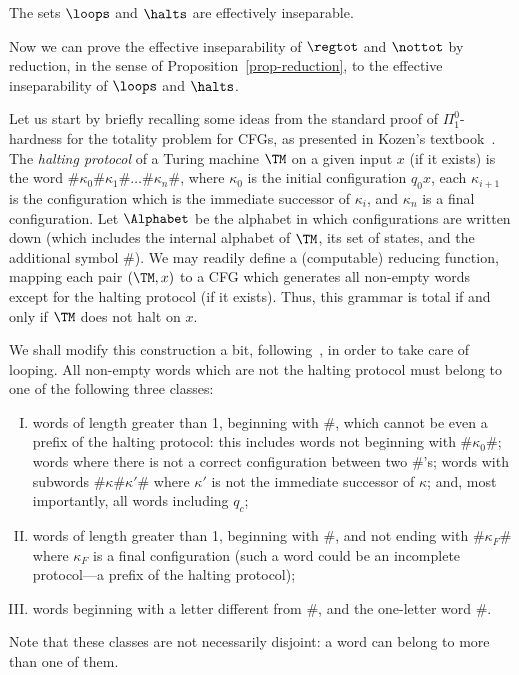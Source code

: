 \begin{proposition}\label{prop-insepCH}
The sets $\loops$ and $\halts$ are effectively inseparable.
\end{proposition}

Now we can prove the effective inseparability of $\regtot$ and $\nottot$ by reduction, in the sense of Proposition~\ref{prop-reduction}, to the effective inseparability of $\loops$ and $\halts$.


Let us start by briefly recalling some ideas from the standard proof of $\Pi^0_1$-hardness for the totality problem for CFGs, as presented in Kozen's textbook~\cite{Kozen1997}. 
The {\em halting protocol} of a Turing machine $\TM$ on a given input $x$ (if it exists) is the word $\# \kappa_0 \# \kappa_1 \# \ldots \# \kappa_n \#$, where $\kappa_0$ is the initial configuration $q_0 x$, each $\kappa_{i+1}$ is the configuration which is the immediate successor of $\kappa_i$, and $\kappa_n$ is a final configuration. Let $\Alphabet$ be the alphabet in which configurations are written down (which includes the internal alphabet of $\TM$, its set of states, and the additional symbol $\#$).
We may readily define a (computable) {reducing function}, mapping each pair $(\TM,x)$ to a CFG which generates all non-empty words except for the halting protocol (if it exists). Thus, this grammar is total if and only if $\TM$ does not halt on $x$. 



We shall modify this construction a bit, following~\cite{Kuznetsov2021TOCL}, in order to take care of looping. 
All non-empty words which are not the halting protocol must belong to one of the following three classes:%
\begin{enumerate}[(I)]
\item\label{not-prefix-haltprot} words of length greater than 1, beginning with $\#$, which cannot be even a prefix of the halting protocol: this includes words not beginning with $\# \kappa_0 \#$; words where there is not a correct configuration between two $\#$'s; words with subwords $\# \kappa \# \kappa' \#$ where $\kappa'$ is not the immediate successor of $\kappa$; and, most importantly, all words including $q_c$;
\item\label{incomplete-prot} words of length greater than 1, beginning with $\#$, and not ending with $\# \kappa_F \#$ where $\kappa_F$ is a final configuration (such a word could be an incomplete protocol---a prefix of the halting protocol);
\item\label{begins-incorrectly} words beginning with a letter different from $\#$, and the one-letter word $\#$.
\end{enumerate}
Note that these classes are not necessarily disjoint: a word can belong to more than one of them.

